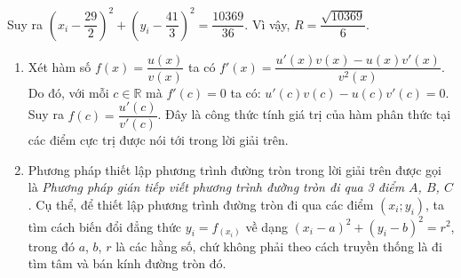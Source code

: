 \begin{bt}
{\begin{enumerate}
 Suy ra $\left(x_i-\dfrac{29}{2}\right)^2+\left(y_i-\dfrac{41}{3}\right)^2=\dfrac{10369}{36}.$ Vì vậy, $R=\dfrac{\sqrt{10369}}{6}.$ 
\end{enumerate}
		\begin{nx}\hfill
			\begin{enumerate}
				\item Xét hàm số $f(x)=\dfrac{u(x)}{v(x)}$ ta có $f'(x)=\dfrac{u'(x)v(x)-u(x)v'(x)}{v^2(x)}.$
				Do đó, với mỗi $c\in \mathbb{R}$ mà $f'(c)=0$ ta có: $u'(c)v(c)-u(c)v'(c)=0$. Suy ra $f(c)=\dfrac{u'(c)}{v'(c)}$. Đây là công thức tính giá trị của hàm phân thức tại các điểm cực trị được nói tới trong lời giải trên.
				\item Phương pháp thiết lập phương trình đường tròn trong lời giải trên được gọi là \textit{Phương pháp gián tiếp viết phương trình đường tròn đi qua 3 điểm $A$, $B$, $C$}. Cụ thể, để thiết lập phương trình đường tròn đi qua các điểm $(x_i;y_i)$, ta tìm cách biến đổi đẳng thức $y_i=f_(x_i)$ về dạng $(x_i-a)^2+(y_i-b)^2=r^2$, trong đó $a$, $b$, $r$ là các hằng số, chứ không phải theo cách truyền thống là đi tìm tâm và bán kính đường tròn đó.   
				
		\end{enumerate}
			
		\end{nx}
	}
\end{bt}


